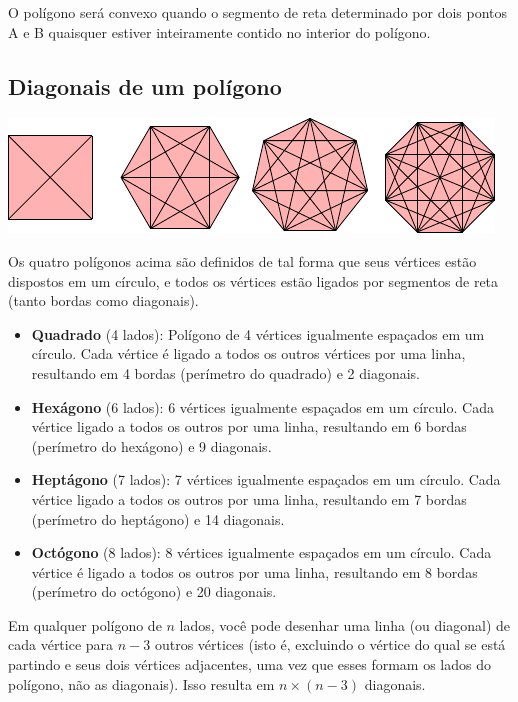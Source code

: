 {O polígono será convexo quando o segmento de reta determinado por dois pontos A e B
quaisquer estiver inteiramente contido no interior do polígono. 

\subsection{Diagonais de um polígono}

\noindent\includegraphics[width=\textwidth]{./tikz/014.pdf}

Os quatro polígonos acima são definidos de tal forma que seus vértices
estão dispostos em um círculo, e todos os vértices estão ligados por segmentos
de reta (tanto bordas como diagonais).

\begin{itemize}
\item \textbf{Quadrado} (4 lados): Polígono de 4
   vértices igualmente espaçados em um círculo. Cada vértice é ligado a todos
   os outros vértices por uma linha, resultando em 4 bordas (perímetro do
   quadrado) e 2 diagonais.

\item \textbf{Hexágono} (6 lados):  6 vértices igualmente espaçados em um círculo. Cada vértice
   ligado a todos os outros por uma linha, resultando em 6 bordas (perímetro
   do hexágono) e 9 diagonais.

\item \textbf{Heptágono} (7 lados): 7 vértices igualmente espaçados em um círculo. Cada
   vértice ligado a todos os outros por uma linha, resultando em 7 bordas
   (perímetro do heptágono) e 14 diagonais.

\item \textbf{Octógono} (8 lados): 8 vértices igualmente espaçados em um círculo.
   Cada vértice é ligado a todos os outros por uma linha, resultando em 8
   bordas (perímetro do octógono) e 20 diagonais.
\end{itemize}

Em qualquer polígono de $n$ lados, você pode desenhar uma linha (ou diagonal)
de cada vértice para $n-3$ outros vértices (isto é, excluindo o vértice do qual se está
partindo e seus dois vértices adjacentes, uma vez que esses formam os lados do polígono, não
as diagonais). Isso resulta em $n \times (n-3)$ diagonais.

}
